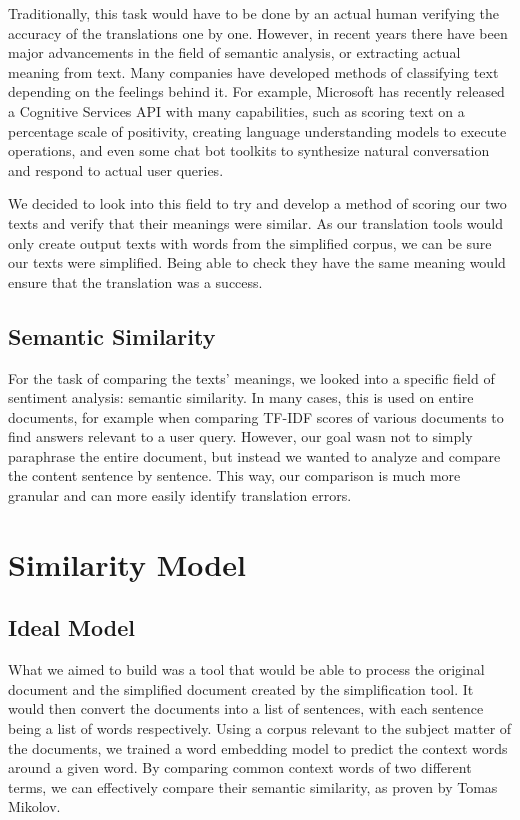 \documentclass[11pt]{article}
\begin{document}
Traditionally, this task would have to be done by an actual human verifying the accuracy of the translations one by one. However, in recent years there have been major advancements in the field of semantic analysis, or extracting actual meaning from text. Many companies have developed methods of classifying text depending on the feelings behind it. For example, Microsoft has recently released a Cognitive Services API with many capabilities, such as scoring text on a percentage scale of positivity, creating language understanding models to execute operations, and even some chat bot toolkits to synthesize natural conversation and respond to actual user queries. 

We decided to look into this field to try and develop a method of scoring our two texts and verify that their meanings were similar. As our translation tools would only create output texts with words from the simplified corpus, we can be sure our texts were simplified. Being able to check they have the same meaning would ensure that the translation was a success.
\subsection{Semantic Similarity}
For the task of comparing the texts' meanings, we looked into a specific field of sentiment analysis: semantic similarity. In many cases, this is used on entire documents, for example when comparing TF-IDF scores of various documents to find answers relevant to a user query. However, our goal wasn not to simply paraphrase the entire document, but instead we wanted to analyze and compare the content sentence by sentence. This way, our comparison is much more granular and can more easily identify translation errors.	

\section{Similarity Model}
\subsection{Ideal Model}
What we aimed to build was a tool that would be able to process the original document and the simplified document created by the simplification tool. It would then convert the documents into a list of sentences, with each sentence being a list of words respectively. Using a corpus relevant to the subject matter of the documents, we trained a word embedding model to predict the context words around a given word. By comparing common context words of two different terms, we can effectively compare their semantic similarity, as proven by Tomas Mikolov. 
\end{document}
